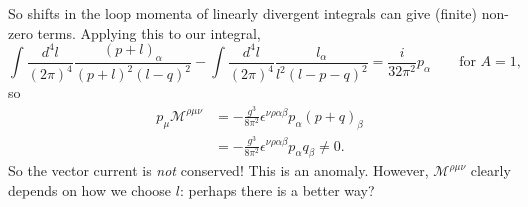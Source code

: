 So shifts in the loop momenta of linearly divergent integrals can give (finite) non-zero terms. Applying this to our integral,
\begin{equation}
\int \frac{d^4l}{(2\pi)^4} \frac{(p+l)_\alpha}{(p+l)^2(l-q)^2} - \int \frac{d^4l}{(2\pi)^4} \frac{l_\alpha}{l^2(l-p-q)^2} = \frac{i}{32\pi^2}p_\alpha \qquad \text{for } A=1,
\end{equation}
so 
\begin{equation}
\begin{split}
p_\mu \mathcal{M}^{\rho \mu \nu} &= -\frac{g^3}{8\pi^2} \epsilon^{\nu \rho \alpha \beta}p_\alpha(p+q)_\beta \\
&= - \frac{g^3}{8 \pi^2} \epsilon^{\nu \rho \alpha \beta}p_\alpha q_\beta \neq 0.
\end{split}
\end{equation}
So the vector current is \textit{not} conserved! This is an anomaly. However, $\mathcal{M}^{\rho \mu \nu}$ clearly depends on how we choose $l$: perhaps there is a better way?

